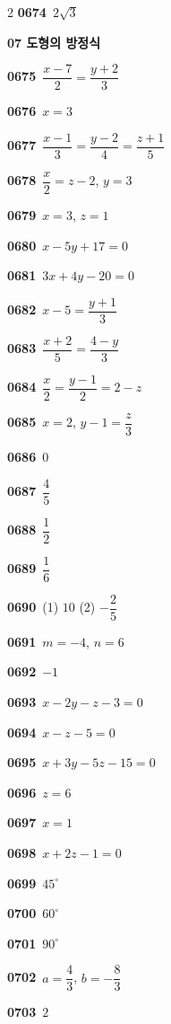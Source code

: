 \documentclass[10pt,a4paper]{article}
\begin{document}
\begin{multicols}{2}
\noindent\textbf{0674}\ $2\sqrt{3}$\par
\noindent\textbf{07 도형의 방정식}\par\smallskip
\noindent\textbf{0675}\ $\dfrac{x-7}{2}=\dfrac{y+2}{3}$\par
\noindent\textbf{0676}\ $x=3$\par
\noindent\textbf{0677}\ $\dfrac{x-1}{3}=\dfrac{y-2}{4}=\dfrac{z+1}{5}$\par
\noindent\textbf{0678}\ $\dfrac{x}{2}=z-2$, $y=3$\par
\noindent\textbf{0679}\ $x=3$, $z=1$\par
\noindent\textbf{0680}\ $x-5y+17=0$\par
\noindent\textbf{0681}\ $3x+4y-20=0$\par
\noindent\textbf{0682}\ $x-5=\dfrac{y+1}{3}$\par
\noindent\textbf{0683}\ $\dfrac{x+2}{5}=\dfrac{4-y}{3}$\par
\noindent\textbf{0684}\ $\dfrac{x}{2}=\dfrac{y-1}{2}=2-z$\par
\noindent\textbf{0685}\ $x=2$, $y-1=\dfrac{z}{3}$\par
\noindent\textbf{0686}\ $0$\par
\noindent\textbf{0687}\ $\dfrac{4}{5}$\par
\noindent\textbf{0688}\ $\dfrac{1}{2}$\par
\noindent\textbf{0689}\ $\dfrac{1}{6}$\par
\noindent\textbf{0690}\ (1) $10$ \quad (2) $-\dfrac{2}{5}$\par
\noindent\textbf{0691}\ $m=-4$, $n=6$\par
\noindent\textbf{0692}\ $-1$\par
\noindent\textbf{0693}\ $x-2y-z-3=0$\par
\noindent\textbf{0694}\ $x-z-5=0$\par
\noindent\textbf{0695}\ $x+3y-5z-15=0$\par
\noindent\textbf{0696}\ $z=6$\par
\noindent\textbf{0697}\ $x=1$\par
\noindent\textbf{0698}\ $x+2z-1=0$\par
\noindent\textbf{0699}\ $45^\circ$\par
\noindent\textbf{0700}\ $60^\circ$\par
\noindent\textbf{0701}\ $90^\circ$\par
\noindent\textbf{0702}\ $a=\dfrac{4}{3}$, $b=-\dfrac{8}{3}$\par
\noindent\textbf{0703}\ $2$\par

\end{multicols}
\end{document}
